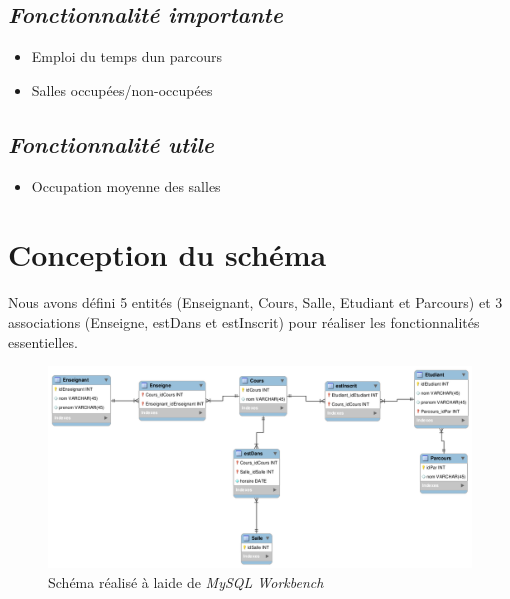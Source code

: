 \documentclass{article}
\begin{document}
\subsection{\textit{Fonctionnalit\'e importante}}
\begin{itemize}
\item Emploi du temps d\textquotesingle un parcours
\item Salles occup\'ees/non-occup\'ees
\end{itemize}
\subsection{\textit{Fonctionnalit\'e utile}}
\begin{itemize}
\item Occupation moyenne des salles
\end{itemize}
\section{Conception du sch\'ema}
Nous avons d\'efini 5 entit\'es (Enseignant, Cours, Salle, Etudiant et Parcours) et 3 associations (Enseigne, estDans et estInscrit) pour r\'ealiser les fonctionnalit\'es essentielles.
\begin{figure}[!h]
\includegraphics[scale=0.40]{diagramm.png}
\caption{Sch\'ema r\'ealis\'e \`a l\textquotesingle aide de \textit{MySQL Workbench}}
\end{figure}
\end{document}
